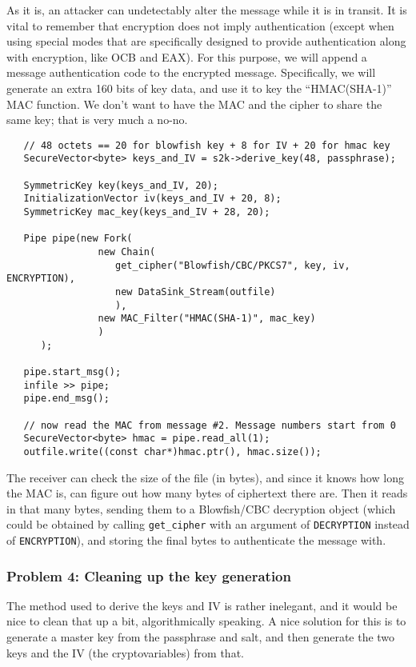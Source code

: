 \documentclass{article}
\newcommand{\type}[1]{\texttt{#1}}
\begin{document}
As it is, an attacker can undetectably alter the message while it is in
transit. It is vital to remember that encryption does not imply authentication
(except when using special modes that are specifically designed to provide
authentication along with encryption, like OCB and EAX). For this purpose, we
will append a message authentication code to the encrypted
message. Specifically, we will generate an extra 160 bits of key data, and use
it to key the ``HMAC(SHA-1)'' MAC function. We don't want to have the MAC and
the cipher to share the same key; that is very much a no-no.

\begin{verbatim}
   // 48 octets == 20 for blowfish key + 8 for IV + 20 for hmac key
   SecureVector<byte> keys_and_IV = s2k->derive_key(48, passphrase);

   SymmetricKey key(keys_and_IV, 20);
   InitializationVector iv(keys_and_IV + 20, 8);
   SymmetricKey mac_key(keys_and_IV + 28, 20);

   Pipe pipe(new Fork(
                new Chain(
                   get_cipher("Blowfish/CBC/PKCS7", key, iv, ENCRYPTION),
                   new DataSink_Stream(outfile)
                   ),
                new MAC_Filter("HMAC(SHA-1)", mac_key)
                )
      );

   pipe.start_msg();
   infile >> pipe;
   pipe.end_msg();

   // now read the MAC from message #2. Message numbers start from 0
   SecureVector<byte> hmac = pipe.read_all(1);
   outfile.write((const char*)hmac.ptr(), hmac.size());
\end{verbatim}

The receiver can check the size of the file (in bytes), and since it knows how
long the MAC is, can figure out how many bytes of ciphertext there are. Then it
reads in that many bytes, sending them to a Blowfish/CBC decryption object
(which could be obtained by calling \verb|get_cipher| with an argument of
\type{DECRYPTION} instead of \type{ENCRYPTION}), and storing the final bytes to
authenticate the message with.

\subsubsection{Problem 4: Cleaning up the key generation}

The method used to derive the keys and IV is rather inelegant, and it would be
nice to clean that up a bit, algorithmically speaking. A nice solution for this
is to generate a master key from the passphrase and salt, and then generate the
two keys and the IV (the cryptovariables) from that.
\end{document}
